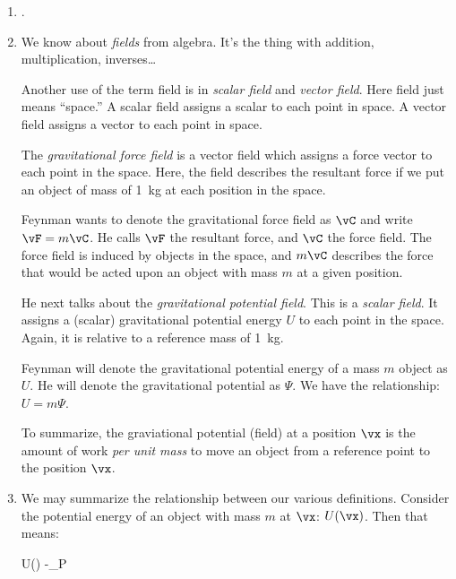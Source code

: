 \begin{enumerate}

  \item {}.

  \item We know about \emph{fields} from algebra. It's the thing with
  addition, multiplication, inverses\dots

  Another use of the term field is in \emph{scalar field} and
  \emph{vector field}. Here field just means ``space.'' A scalar field
  assigns a scalar to each point in space. A vector field assigns a
  vector to each point in space.

  The \emph{gravitational force field} is a vector field which assigns a
  force vector to each point in the space. Here, the field describes the
  resultant force if we put an object of mass of \SI{1}{kg} at each
  position in the space.

  Feynman wants to denote the gravitational force field as $\vC$ and
  write $\vF = m \vC$. He calls $\vF$ the resultant force, and $\vC$ the
  force field. The force field is induced by objects in the space, and
  $m \vC$ describes the force that would be acted upon an object with
  mass $m$ at a given position.

  He next talks about the \emph{gravitational potential field}. This is
  a \emph{scalar field}. It assigns a (scalar) gravitational potential
  energy $U$ to each point in the space. Again, it is relative to a
  reference mass of \SI{1}{kg}.

  Feynman will denote the gravitational potential energy of a mass $m$
  object as $U$. He will denote the gravitational potential as $\Psi$.
  We have the relationship: $U = m \Psi$.

  To summarize, the graviational potential (field) at a position $\vx$
  is the amount of work \emph{per unit mass} to move an object from a
  reference point to the position $\vx$.

  \item We may summarize the relationship between our various
  definitions. Consider the potential energy of an object with mass $m$
  at $\vx$: $U(\vx)$. Then that means:

  \begin{nedqn}
    U(\vx)
  \eqcol
    -\int_P \vF \cdot \diff{\vs}
  \end{nedqn}


\end{enumerate}
